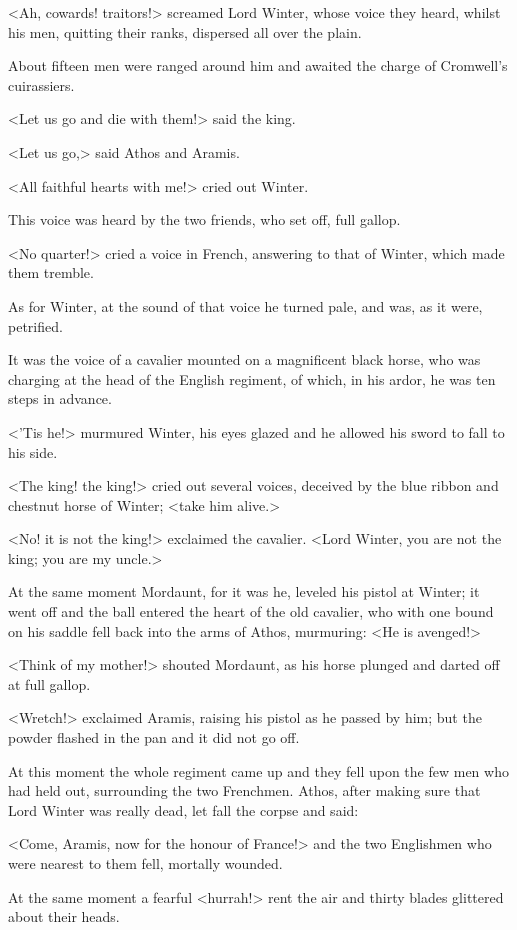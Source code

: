 <Ah, cowards! traitors!> screamed Lord Winter, whose voice they heard, whilst his men, quitting their ranks, dispersed all over the plain.

About fifteen men were ranged around him and awaited the charge of Cromwell's cuirassiers.

<Let us go and die with them!> said the king.

<Let us go,> said Athos and Aramis.

<All faithful hearts with me!> cried out Winter.

This voice was heard by the two friends, who set off, full gallop.

<No quarter!> cried a voice in French, answering to that of Winter, which made them tremble.

As for Winter, at the sound of that voice he turned pale, and was, as it were, petrified.

It was the voice of a cavalier mounted on a magnificent black horse, who was charging at the head of the English regiment, of which, in his ardor, he was ten steps in advance.

<'Tis he!> murmured Winter, his eyes glazed and he allowed his sword to fall to his side.

<The king! the king!> cried out several voices, deceived by the blue ribbon and chestnut horse of Winter; <take him alive.>

<No! it is not the king!> exclaimed the cavalier. <Lord Winter, you are not the king; you are my uncle.>

At the same moment Mordaunt, for it was he, leveled his pistol at Winter; it went off and the ball entered the heart of the old cavalier, who with one bound on his saddle fell back into the arms of Athos, murmuring: <He is avenged!>

<Think of my mother!> shouted Mordaunt, as his horse plunged and darted off at full gallop.

<Wretch!> exclaimed Aramis, raising his pistol as he passed by him; but the powder flashed in the pan and it did not go off.

At this moment the whole regiment came up and they fell upon the few men who had held out, surrounding the two Frenchmen. Athos, after making sure that Lord Winter was really dead, let fall the corpse and said:

<Come, Aramis, now for the honour of France!> and the two Englishmen who were nearest to them fell, mortally wounded.

At the same moment a fearful <hurrah!> rent the air and thirty blades glittered about their heads.


